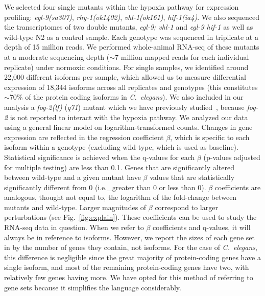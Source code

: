 \documentclass[10pt, onecolumn]{article}
\newcommand{\cel}{\emph{C.~elegans}}
\newcommand{\gene}[1]{\emph{#1}}
\newcommand{\fog}{\emph{\mbox{fog-2(lf)}}}
\begin{document}
We selected four single mutants within the hypoxia pathway for expression profiling:
\gene{egl-9}\emph{(sa307)}, \gene{rhy-1}\emph{(ok1402)},
\gene{vhl-1}\emph{(ok161)}, \gene{hif-1}\emph{(ia4)}. We also sequenced the
transcriptomes of two double mutants, \gene{egl-9; vhl-1} and \gene{egl-9 hif-1}
as well as wild-type N2 as a control sample. Each genotype  was sequenced in
triplicate at a depth of 15 million reads. We performed whole-animal RNA-seq of
these mutants at a moderate sequencing depth ($\sim7$ million mapped reads for
each individual replicate) under normoxic conditions. For single samples, we
identified around 22,000 different isoforms per sample, which allowed us to
measure differential expression of 18,344 isoforms across all replicates and
genotypes (this constitutes  $\sim$70\% of the protein coding isoforms in
\cel{}). We also included in our analysis a \fog{} (\emph{q71}) mutant which we
have previously studied~\cite{Angeles-Albores2016a}, because \gene{fog-2} is not
reported to interact with the hypoxia pathway.
We analyzed our data using a general linear model on logarithm-transformed counts.
Changes in gene expression are reflected in the regression coefficient $\beta$,
which is specific to each isoform within a genotype (excluding wild-type, which
is used as baseline). Statistical significance is achieved when the q-values for
each $\beta$ (p-values adjusted for multiple testing) are less than 0.1. Genes
that are significantly altered between wild-type and a given mutant have $\beta$
values that are statistically significantly different from 0 (i.e.\_greater than
0 or less than 0). $\beta$ coefficients are analogous, thought not equal to, the
logarithm of the fold-change between mutants and wild-type. Larger magnitudes of
$\beta$ correspond to larger perturbations (see Fig.~\ref{fig:explain}). These
coefficients can be used to study the RNA-seq data in question. When we refer to
$\beta$ coefficients and q-values, it will always be in reference to isoforms.
However, we report the sizes of each gene set in by the number of genes they
contain, not isoforms. For the case of \cel{}, this difference is negligible since
the great majority of protein-coding genes have a single isoform, and most of the
remaining protein-coding genes have two, with relatively few genes having more.
We have opted for this method of referring to gene sets because it simplifies the
language considerably.
\end{document}
